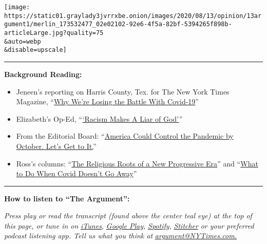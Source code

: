 \texttt{[image: https://static01.graylady3jvrrxbe.onion/images/2020/08/13/opinion/13argument1/merlin\_173532477\_02e02102-92e6-4f5a-82bf-5394265f898b-articleLarge.jpg?quality=75\\\&auto=webp\\\&disable=upscale]}

\begin{center}\rule{0.5\linewidth}{\linethickness}\end{center}

\textbf{Background Reading:}

\begin{itemize}
\item
  Jeneen's reporting on Harris County, Tex. for The New York Times
  Magazine,
  ``\href{https://www.nytimes3xbfgragh.onion/2020/07/14/magazine/covid-19-public-health-texas.html}{Why
  We're Losing the Battle With Covid-19}''
\item
  Elizabeth's Op-Ed,
  ``\href{https://www.nytimes3xbfgragh.onion/2020/08/06/opinion/sunday/gloria-purvis-george-floyd-blm.html}{`Racism
  Makes A Liar of God'}''
\item
  From the Editorial Board:
  ``\href{https://www.nytimes3xbfgragh.onion/2020/08/08/opinion/sunday/coronavirus-response-testing-lockdown.html}{America
  Could Control the Pandemic by October. Let's Get to It.}''
\item
  Ross's columns:
  ``\href{https://www.nytimes3xbfgragh.onion/2020/07/07/opinion/protestant-progressive-reformation.html}{The
  Religious Roots of a New Progressive Era}'' and
  ``\href{https://www.nytimes3xbfgragh.onion/2020/08/08/opinion/sunday/covid-lyme-treatment-medicine.html}{What
  to Do When Covid Doesn't Go Away}''
\end{itemize}

\begin{center}\rule{0.5\linewidth}{\linethickness}\end{center}

\textbf{How to listen to ``The Argument'':}

\emph{Press play or read the transcript (found above the center teal
eye) at the top of this page, or tune in on}
\href{https://itunes.apple.com/us/podcast/the-argument/id1438024613?mt=2}{\emph{iTunes}}\emph{,}
\href{https://play.google.com/music/listen?u=0\#/ps/Idxib4hsg3yviao4gtym76knjjy}{\emph{Google
Play}}\emph{,}
\href{https://open.spotify.com/episode/5fIsHqqunLBwoxPSUUSGre?si=Rz5D9VnlRFKdGMu8ixzBOw}{\emph{Spotify}}\emph{,}
\href{https://www.stitcher.com/podcast/the-new-york-times/the-argument}{\emph{Stitcher}}
\emph{or your preferred podcast listening app. Tell us what you think
at} \href{mailto:argument@NYTimes.com}{\emph{argument@NYTimes.com.}}

